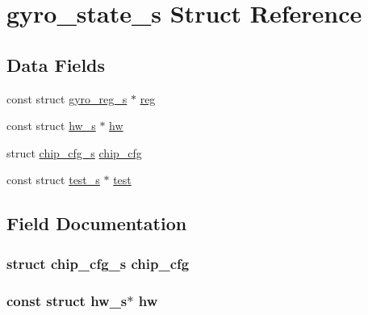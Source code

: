 \hypertarget{structgyro__state__s}{}\section{gyro\+\_\+state\+\_\+s Struct Reference}
\label{structgyro__state__s}
\subsection*{Data Fields}
\begin{DoxyCompactItemize}
\item 
const struct \hyperlink{structgyro__reg__s}{gyro\+\_\+reg\+\_\+s} $\ast$ \hyperlink{structgyro__state__s_ae857e1285c583b7438a208edd691a38e}{reg}
\item 
const struct \hyperlink{structhw__s}{hw\+\_\+s} $\ast$ \hyperlink{structgyro__state__s_a5bac30a96752691e4cc723735060e360}{hw}
\item 
struct \hyperlink{structchip__cfg__s}{chip\+\_\+cfg\+\_\+s} \hyperlink{structgyro__state__s_ac895217592e2084bd520b0be8e9d20ee}{chip\+\_\+cfg}
\item 
const struct \hyperlink{structtest__s}{test\+\_\+s} $\ast$ \hyperlink{structgyro__state__s_a4dc7fb069be996a5f40e25c01338a3ca}{test}
\end{DoxyCompactItemize}


\subsection{Field Documentation}
\subsubsection[{\texorpdfstring{chip\+\_\+cfg}{chip_cfg}}]{\setlength{\rightskip}{0pt plus 5cm}struct {\bf chip\+\_\+cfg\+\_\+s} chip\+\_\+cfg}\hypertarget{structgyro__state__s_ac895217592e2084bd520b0be8e9d20ee}{}\label{structgyro__state__s_ac895217592e2084bd520b0be8e9d20ee}
\subsubsection[{\texorpdfstring{hw}{hw}}]{\setlength{\rightskip}{0pt plus 5cm}const struct {\bf hw\+\_\+s}$\ast$ hw}\hypertarget{structgyro__state__s_a5bac30a96752691e4cc723735060e360}{}\label{structgyro__state__s_a5bac30a96752691e4cc723735060e360}
